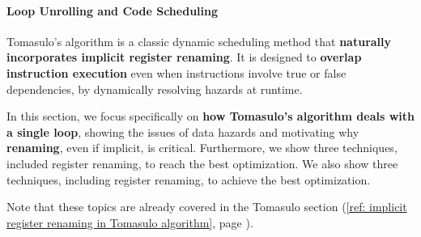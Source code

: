 \paragraph{Loop Unrolling and Code Scheduling}

Tomasulo's algorithm is a classic dynamic scheduling method that \textbf{naturally incorporates implicit register renaming}. It is designed to \textbf{overlap instruction execution} even when instructions involve true or false dependencies, by dynamically resolving hazards at runtime.

\highspace
In this section, we focus specifically on \textbf{how Tomasulo's algorithm deals with a single loop}, showing the issues of data hazards and motivating why \textbf{renaming}, even if implicit, is critical. Furthermore, we show three techniques, included register renaming, to reach the best optimization. We also show three techniques, including register renaming, to achieve the best optimization.

\highspace
Note that these topics are already covered in the Tomasulo section (\ref{ref: implicit register renaming in Tomasulo algorithm}, page ).


